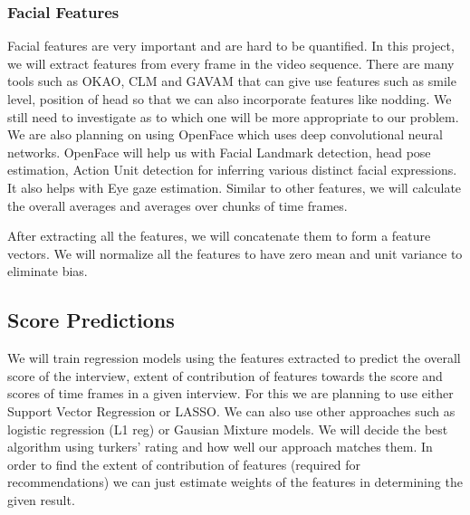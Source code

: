 \subsubsection{Facial Features}
Facial features are very important and are hard to be quantified. In this project, we will extract features from every frame in the video sequence. There are many tools such as OKAO, CLM and GAVAM that can give use features such as smile level, position of head so that we can also incorporate features like nodding. We still need to investigate as to which one will be more appropriate to our problem. We are also planning on using OpenFace which uses deep convolutional neural networks. OpenFace will help us with Facial Landmark detection, head pose estimation, Action Unit detection for inferring various distinct facial expressions. It also helps with Eye gaze estimation. Similar to other features, we will calculate the overall averages and averages over chunks of time frames.

After extracting all the features, we will concatenate them to form a feature vectors. We will normalize all the features to have zero mean and unit variance to eliminate bias.

\subsection{Score Predictions}
We will train regression models using the features extracted to predict the overall score of the interview, extent of contribution of features towards the score and scores of time frames in a given interview. For this we are planning to use either Support Vector Regression or LASSO. We can also use other approaches such as logistic regression (L1 reg) or Gausian Mixture models. We will decide the best algorithm using turkers' rating and how well our approach matches them. In order to find the extent of contribution of features (required for recommendations) we can just estimate weights of the features in determining the given result.
